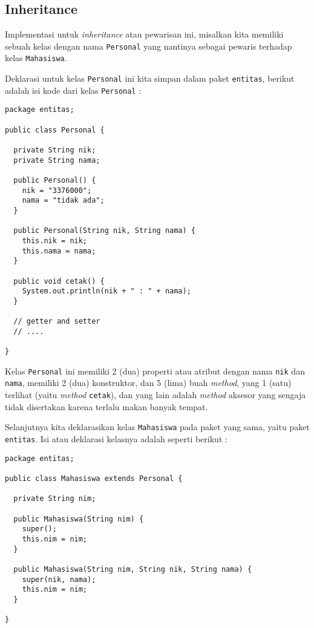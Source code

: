 \subsection{Inheritance}

Implementasi untuk \textit{inheritance} atau pewarisan ini, misalkan kita memiliki sebuah kelas dengan nama \texttt{Personal} yang nantinya sebagai pewaris terhadap kelas \texttt{Mahasiswa}. 

Deklarasi untuk kelas \texttt{Personal} ini kita simpan dalam paket \texttt{entitas}, berikut adalah isi kode dari kelas \texttt{Personal} :

\begin{lstlisting}
package entitas;

public class Personal {

  private String nik;
  private String nama;
  
  public Personal() {
    nik = "3376000";
    nama = "tidak ada";
  }
  
  public Personal(String nik, String nama) {
    this.nik = nik;
    this.nama = nama;
  }
  
  public void cetak() {
    System.out.println(nik + " : " + nama);
  }
  
  // getter and setter
  // .... 

}
\end{lstlisting}

Kelas \texttt{Personal} ini memiliki 2 (dua) properti atau atribut dengan nama \texttt{nik} dan \texttt{nama}, memiliki 2 (dua) konstruktor, dan 5 (lima) buah \textit{method}, yang 1 (satu) terlihat (yaitu \textit{method} \texttt{cetak}), dan yang lain adalah \textit{method} aksesor yang sengaja tidak disertakan karena terlalu makan banyak tempat.

Selanjutnya kita deklarasikan kelas \texttt{Mahasiswa} pada paket yang sama, yaitu paket \texttt{entitas}. Isi atau deklarasi kelasnya adalah seperti berikut :

\begin{lstlisting}
package entitas;

public class Mahasiswa extends Personal {
  
  private String nim;
  
  public Mahasiswa(String nim) {
    super();
    this.nim = nim;
  }
  
  public Mahasiswa(String nim, String nik, String nama) {
    super(nik, nama);
    this.nim = nim;
  }
  
}
\end{lstlisting}

